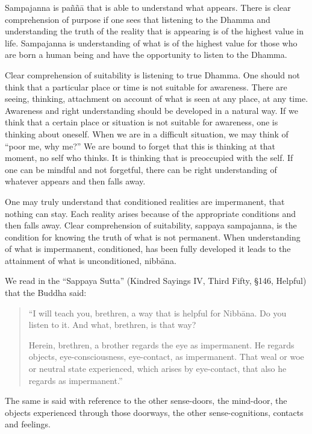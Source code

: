 Sampajanna is paññā that is able to understand what appears. There is clear comprehension of purpose if one sees that listening to the Dhamma and understanding the 
truth of the reality that is appearing is of the highest value in life. Sampajanna is understanding of what is of the highest value for those who are born a human being and 
have the opportunity to listen to the Dhamma. 

Clear comprehension of suitability is listening to true Dhamma. One should not think 
that a particular place or time is not suitable for awareness. There are seeing, thinking, attachment on account of what is seen at any place, at any time. Awareness and 
right understanding should be developed in a natural way. If we think that a certain 
place or situation is not suitable for awareness, one is thinking about oneself. When 
we are in a difficult situation, we may think of ``poor me, why me?'' We are bound to 
forget that this is thinking at that moment, no self who thinks. It is thinking that is 
preoccupied with the self. If one can be mindful and not forgetful, there can be right 
understanding of whatever appears and then falls away. 

One may truly understand that conditioned realities are impermanent, that nothing 
can stay. Each reality arises because of the appropriate conditions and then falls 
away. Clear comprehension of suitability, sappaya sampajanna, is the condition for 
knowing the truth of what is not permanent. When understanding of what is impermanent, conditioned, has been fully developed it leads to the attainment of what is 
unconditioned, nibbāna. 

We read in the ``Sappaya Sutta'' (Kindred Sayings IV, Third Fifty, §146, Helpful) that 
the Buddha said: 

\begin{quote}
``I will teach you, brethren, a way that is helpful for Nibbāna. Do you 
listen to it. And what, brethren, is that way? 

Herein, brethren, a brother regards the eye as impermanent. He regards objects, eye-consciousness, eye-contact, as impermanent. That 
weal or woe or neutral state experienced, which arises by eye-contact, 
that also he regards as impermanent.'' 
\end{quote}

The same is said with reference to the other sense-doors, the mind-door, the objects 
experienced through those doorways, the other sense-cognitions, contacts and feelings. 

